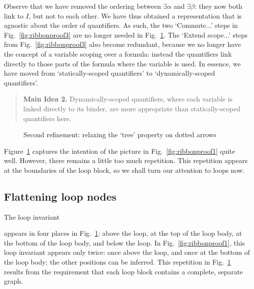 \documentclass[svgnames]{llncs}
\begin{document}
\noindent Observe that we have removed the ordering between $∃α$ and $∃β$: they now both link to $I$, but not to each other. We have thus obtained a representation that is agnostic about the order of quantifiers. As such, the two `Commute...' steps in Fig.~\ref{fig:ribbonproof3} are no longer needed in Fig.~\ref{fig:ribbonproof4}. The `Extend scope...' steps from Fig.~\ref{fig:ribbonproof3} also become redundant, because we no longer have the concept of a variable scoping over a formula: instead the quantifiers link directly to those parts of the formula where the variable is used. In essence, we have moved from `statically-scoped quantifiers' to `dynamically-scoped quantifiers'.

\begin{quote}\noindent 
{\bf Main Idea 2.} Dynamically-scoped quantifiers, where each variable is linked directly to its binder, are more appropriate than statically-scoped quantifiers here.
\end{quote}

\begin{figure}
\begin{center}

\end{center}
\caption{Second refinement: relaxing the `tree' property on dotted arrows}
\label{fig:ribbonproof4}
\end{figure}

\noindent Figure~\ref{fig:ribbonproof4} captures the intention of the picture in Fig.~\ref{fig:ribbonproof1} quite well. However, there remains a little too much repetition. This repetition appears at the boundaries of the loop block, so we shall turn our attention to loops now.

\clearpage

\subsection{Flattening loop nodes}

The loop invariant
\begin{center}
\end{center}
appears in four places in Fig.~\ref{fig:ribbonproof4}: above the loop, at the top of the loop body, at the bottom of the loop body, and below the loop. In Fig.~\ref{fig:ribbonproof1}, this loop invariant appears only twice: once above the loop, and once at the bottom of the loop body; the other positions can be inferred. This repetition in Fig.~\ref{fig:ribbonproof4} results from the requirement that each loop block contains a complete, separate graph.
\end{document}
